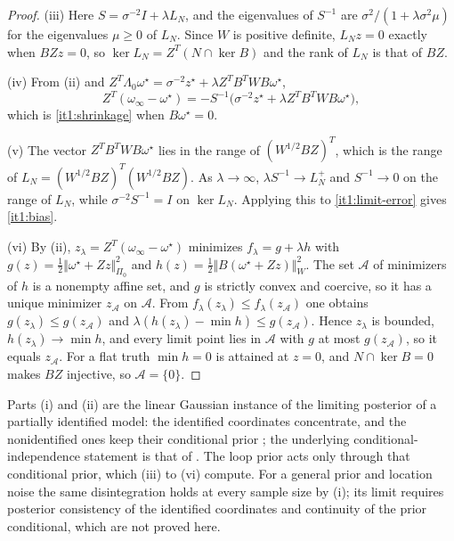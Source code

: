 \begin{proof}
(iii) Here $S=\sigma^{-2}I+\lambda L_N$, and the eigenvalues of $S^{-1}$ are $\sigma^2/(1+\lambda\sigma^2\mu)$ for the eigenvalues $\mu\geq0$ of $L_N$. Since $W$ is positive definite, $L_Nz=0$ exactly when $BZz=0$, so $\ker L_N=Z^T(N\cap\ker B)$ and the rank of $L_N$ is that of $BZ$.

(iv) From (ii) and $Z^T\Lambda_0\omega^\star=\sigma^{-2}z^\star+\lambda Z^TB^TWB\omega^\star$,
\begin{equation}
Z^T(\omega_\infty-\omega^\star)=-S^{-1}\bigl(\sigma^{-2}z^\star+\lambda Z^TB^TWB\omega^\star\bigr),
\label{it1:limit-error}
\end{equation}
which is \cref{it1:shrinkage} when $B\omega^\star=0$.

(v) The vector $Z^TB^TWB\omega^\star$ lies in the range of $(W^{1/2}BZ)^T$, which is the range of $L_N=(W^{1/2}BZ)^T(W^{1/2}BZ)$. As $\lambda\to\infty$, $\lambda S^{-1}\to L_N^+$ and $S^{-1}\to0$ on the range of $L_N$, while $\sigma^{-2}S^{-1}=I$ on $\ker L_N$. Applying this to \cref{it1:limit-error} gives \cref{it1:bias}.

(vi) By (ii), $z_\lambda=Z^T(\omega_\infty-\omega^\star)$ minimizes $f_\lambda=g+\lambda h$ with $g(z)=\frac12\Vert\omega^\star+Zz\Vert_{\Pi_0}^2$ and $h(z)=\frac12\Vert B(\omega^\star+Zz)\Vert_W^2$. The set $\mathcal A$ of minimizers of $h$ is a nonempty affine set, and $g$ is strictly convex and coercive, so it has a unique minimizer $z_{\mathcal A}$ on $\mathcal A$. From $f_\lambda(z_\lambda)\leq f_\lambda(z_{\mathcal A})$ one obtains $g(z_\lambda)\leq g(z_{\mathcal A})$ and $\lambda(h(z_\lambda)-\min h)\leq g(z_{\mathcal A})$. Hence $z_\lambda$ is bounded, $h(z_\lambda)\to\min h$, and every limit point lies in $\mathcal A$ with $g$ at most $g(z_{\mathcal A})$, so it equals $z_{\mathcal A}$. For a flat truth $\min h=0$ is attained at $z=0$, and $N\cap\ker B=0$ makes $BZ$ injective, so $\mathcal A=\{0\}$.
\end{proof}

Parts (i) and (ii) are the linear Gaussian instance of the limiting posterior of a partially identified model: the identified coordinates concentrate, and the nonidentified ones keep their conditional prior \citep{Poirier1998,Gustafson2010}; the underlying conditional-independence statement is that of \citet{Dawid1979}. The loop prior acts only through that conditional prior, which (iii) to (vi) compute. For a general prior and location noise the same disintegration holds at every sample size by (i); its limit requires posterior consistency of the identified coordinates and continuity of the prior conditional, which are not proved here.

